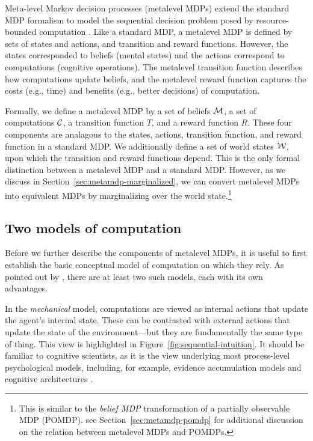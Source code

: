 Meta-level Markov decision processes (metalevel MDPs) extend the standard MDP formalism to model the sequential decision problem posed by resource-bounded computation \citep{hay2012selecting}. Like a standard MDP, a metalevel MDP is defined by sets of states and actions, and transition and reward functions. However, the states corresponded to beliefs (mental states) and the actions correspond to computations (cognitive operations). The metalevel transition function describes how computations update beliefs, and the metalevel reward function captures the costs (e.g., time) and benefits (e.g., better decisions) of computation.

Formally, we define a metalevel MDP by a set of beliefs $\mathcal{M}$, a set of computations $\mathcal{C}$, a transition function $T$, and a reward function $R$. These four components are analagous to the states, actions, transition function, and reward function in a standard MDP. We additionally define a set of world states $\mathcal{W}$, upon which the transition and reward functions depend. This is the only formal distinction between a metalevel MDP and a standard MDP. However, as we discuss in Section~\ref{sec:metamdp-marginalized}, we can convert metalevel MDPs into equivalent MDPs by marginalizing over the world state.\footnote{This is similar to the \emph{belief MDP} transformation of a partially observable MDP (POMDP). see Section~\ref{sec:metamdp-pomdp} for additional discussion on the relation between metalevel MDPs and POMDPs.}



\subsection{Two models of computation}

Before we further describe the components of metalevel MDPs, it is useful to first establish the basic conceptual model of computation on which they rely. As pointed out by \citet[Chapter~7]{hay2016principles}, there are at least two such models, each with its own advantages.

In the \emph{mechanical} model, computations are viewed as internal actions that update the agent's internal state. These can be contrasted with external actions that update the state of the environment---but they are fundamentally the same type of thing. This view is highlighted in Figure~\ref{fig:sequential-intuition}. It should be familiar to cognitive scientists, as it is the view underlying most process-level psychological models, including, for example, evidence accumulation models and cognitive architectures .

